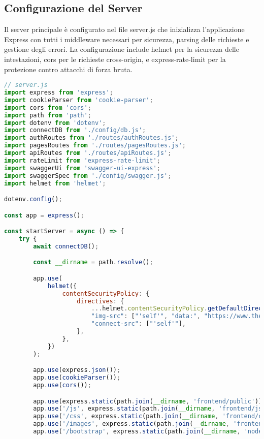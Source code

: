 \documentclass[12pt,a4paper]{article}
\begin{document}
\subsection{Configurazione del Server}

Il server principale è configurato nel file server.js che inizializza l'applicazione Express con tutti i middleware necessari per sicurezza, parsing delle richieste e gestione degli errori. La configurazione include helmet per la sicurezza delle intestazioni, cors per le richieste cross-origin, e express-rate-limit per la protezione contro attacchi di forza bruta.

\begin{lstlisting}[language=JavaScript, caption=Configurazione del server principale]
// server.js
import express from 'express';
import cookieParser from 'cookie-parser';
import cors from 'cors';
import path from 'path';
import dotenv from 'dotenv';
import connectDB from './config/db.js';
import authRoutes from './routes/authRoutes.js';
import pagesRoutes from './routes/pagesRoutes.js';
import apiRoutes from './routes/apiRoutes.js';
import rateLimit from 'express-rate-limit';
import swaggerUi from 'swagger-ui-express';
import swaggerSpec from './config/swagger.js';
import helmet from 'helmet';

dotenv.config();

const app = express();

const startServer = async () => {
    try {
        await connectDB();

        const __dirname = path.resolve();

        app.use(
            helmet({
                contentSecurityPolicy: {
                    directives: {
                        ...helmet.contentSecurityPolicy.getDefaultDirectives(),
                        "img-src": ["'self'", "data:", "https://www.themealdb.com"],
                        "connect-src": ["'self'"],
                    },
                },
            })
        );

        app.use(express.json());
        app.use(cookieParser());
        app.use(cors());

        app.use(express.static(path.join(__dirname, 'frontend/public')));
        app.use('/js', express.static(path.join(__dirname, 'frontend/js')));
        app.use('/css', express.static(path.join(__dirname, 'frontend/css')));
        app.use('/images', express.static(path.join(__dirname, 'frontend/public/images')));
        app.use('/bootstrap', express.static(path.join(__dirname, 'node_modules/bootstrap/dist')));


\end{lstlisting}
\end{document}
